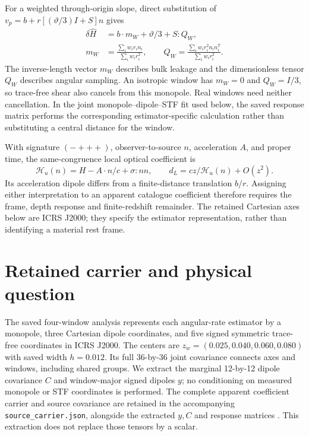 \documentclass[aps,prd,reprint,onecolumn,superscriptaddress,nofootinbib]{revtex4-2}
\begin{document}
For a weighted through-origin slope, direct substitution of $v_p=b+r[(\vartheta/3)I+S]n$ gives
\begin{align}
 \delta\widehat H&=b\cdot m_W+\vartheta/3+S:Q_W,\\
 m_W&=\frac{\sum_iw_ir_in_i}{\sum_iw_ir_i^2},\qquad
 Q_W=\frac{\sum_iw_ir_i^2n_in_i^T}{\sum_iw_ir_i^2}.
 \label{eq:window}
\end{align}
The inverse-length vector $m_W$ describes bulk leakage and the dimensionless tensor $Q_W$ describes angular sampling. An isotropic window has $m_W=0$ and $Q_W=I/3$, so trace-free shear also cancels from this monopole. Real windows need neither cancellation. In the joint monopole--dipole--STF fit used below, the saved response matrix performs the corresponding estimator-specific calculation rather than substituting a central distance for the window.

With signature $(-+++)$, observer-to-source $n$, acceleration $A$, and proper time, the same-congruence local optical coefficient is
\begin{equation}
 \mathcal H_u(n)=H-A\cdot n/c+\sigma:nn,\qquad d_L=cz/\mathcal H_u(n)+O(z^2).
\end{equation}
Its acceleration dipole differs from a finite-distance translation $b/r$. Assigning either interpretation to an apparent catalogue coefficient therefore requires the frame, depth response and finite-redshift remainder. The retained Cartesian axes below are ICRS J2000; they specify the estimator representation, rather than identifying a material rest frame.

\section{Retained carrier and physical question}

The saved four-window analysis represents each angular-rate estimator by a monopole, three Cartesian dipole coordinates, and five signed symmetric trace-free coordinates in ICRS J2000. The centers are $z_w=(0.025,0.040,0.060,0.080)$ with saved width $h=0.012$. Its full 36-by-36 joint covariance connects axes and windows, including shared groups. We extract the marginal 12-by-12 dipole covariance $C$ and window-major signed dipoles $y$; no conditioning on measured monopole or STF coordinates is performed. The complete apparent coefficient carrier and source covariance are retained in the accompanying \texttt{source\_carrier.json}, alongside the extracted $y,C$ and response matrices \cite{h03,physical}. This extraction does not replace those tensors by a scalar.
\end{document}
